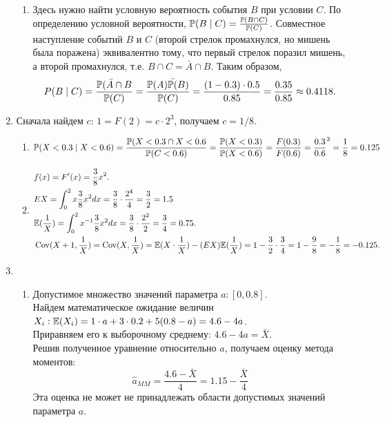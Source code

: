 \documentclass[pdftex,12pt,a4paper]{article}
\begin{document}
\begin{enumerate}
\begin{enumerate}
\item Здесь нужно найти условную вероятность события $B$ при условии $C$. По определению условной вероятности, $\P(B\mid C)=\frac{\P(B\cap C)}{\P(C)}$. Совместное наступление событий $B$ и $C$ (второй стрелок промахнулся, но мишень была поражена) эквивалентно тому, что первый стрелок поразил мишень, а второй промахнулся, т.е. $B\cap C=\bar{A}\cap B$. Таким образом, \begin{equation}
P(B\mid C)=\frac{\P(\bar{A}\cap B}{\P(C)}=\frac{\P(\bar{A)\P(B)}}{\P(C)}=\frac{(1-0.3)\cdot 0.5}{0.85}=\frac{0.35}{0.85}\approx 0.4118.
\end{equation}
\end{enumerate}
\item Сначала найдем $c$: $1=F(2)=c\cdot 2^3$, получаем $c=1/8$.
\begin{enumerate}
\item 
\begin{equation}
\P(X<0.3\mid X<0.6)=\frac{\P(X<0.3\cap X<0.6}{\P(C<0.6)}=\frac{\P(X<0.3)}{\P(X<0.6)}=\frac{F(0.3)}{F(0.6)}={\frac{0.3}{0.6}}^3=\frac{1}{8}=0.125
\end{equation}
\item 
\begin{align}
&f(x)=F'(x)=\frac{3}{8}x^2.\\
&EX=\int_0^2 x\frac{3}{8}x^2 dx=\frac{3}{8}\cdot\frac{2^4}{4}=\frac{3}{2}=1.5\\
&\E(\frac{1}{X})=\int_0^2 x^{-1}\frac{3}{8}x^2 dx=\frac{3}{8}\cdot\frac{2^2}{2}=\frac{3}{4}=0.75.\\
&\Cov(X+1,\frac{1}{X})=\Cov(X,\frac{1}{X})=\E(X\cdot \frac{1}{X})-(EX)\E(\frac{1}{X})=1-\frac{3}{2}\cdot \frac{3}{4}=1-\frac{9}{8}=-\frac{1}{8}=-0.125.
\end{align}
\end{enumerate}
\item \begin{enumerate}
\item Допустимое множество значений параметра $a: [0,0.8]$.\\
Найдем математическое ожидание величин $X_i: \E(X_i)=1\cdot a+3\cdot 0.2+5(0.8-a)=4.6-4a$.\\
Приравняем его к выборочному среднему: $4.6-4a=\bar{X}$.\\
Решив полученное уравнение относительно $a$, получаем оценку метода моментов:
\begin{equation}
\hat{a}_{MM}=\frac{4.6-\bar{X}}{4}=1.15-\frac{\bar{X}}{4}
\end{equation}
Эта оценка не может не принадлежать области допустимых значений параметра $a$.

\end{enumerate}
\end{enumerate}
\end{document}
